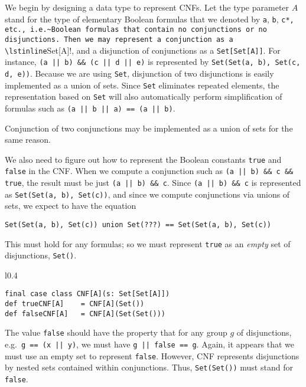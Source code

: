 We begin by designing a data type to represent CNFs. Let the type
parameter $A$ stand for the type of elementary Boolean formulas that
we denoted by \lstinline!a!, \lstinline!b!, \lstinline*!c*, etc.,
i.e.~Boolean formulas that contain no conjunctions or no disjunctions.
Then we may represent a conjunction as a \lstinline!Set[A]!, and
a disjunction of conjunctions as a \lstinline!Set[Set[A]]!. For instance,
\lstinline!(a || b) && (c || d || e)! is represented by \lstinline!Set(Set(a, b), Set(c, d, e))!.
Because we are using \lstinline!Set!, disjunction of two disjunctions
is easily implemented as a union of sets. Since \lstinline!Set! eliminates
repeated elements, the representation based on \lstinline!Set! will
also automatically perform simplification of formulas such as \lstinline!(a || b || a) == (a || b)!.

Conjunction of two conjunctions may be implemented as a union of sets
for the same reason.

We also need to figure out how to represent the Boolean constants
\lstinline!true! and \lstinline!false! in the CNF. When we compute
a conjunction such as \lstinline!(a || b) && c && true!, the result
must be just \lstinline!(a || b) && c!. Since \lstinline!(a || b) && c!
is represented as \lstinline!Set(Set(a, b), Set(c))!, and since we
compute conjunctions via unions of sets, we expect to have the equation
\begin{lstlisting}
Set(Set(a, b), Set(c)) union Set(???) == Set(Set(a, b), Set(c))
\end{lstlisting}
This must hold for any formulas; so we must represent \lstinline!true!
as an \emph{empty} set of disjunctions, \lstinline!Set()!.

\begin{wrapfigure}{l}{0.4\columnwidth}%
\vspace{-0.6\baselineskip}
\begin{lstlisting}
final case class CNF[A](s: Set[Set[A]])
def trueCNF[A]    = CNF[A](Set())
def falseCNF[A]   = CNF[A](Set(Set()))
\end{lstlisting}
\vspace{-0.8\baselineskip}
\end{wrapfigure}%

The value \lstinline!false! should have the property that for any
group $g$ of disjunctions, e.g.~\lstinline!g == (x || y)!, we must
have \lstinline!g || false == g!. Again, it appears that we must
use an empty set to represent \lstinline!false!. However, CNF represents
disjunctions by nested sets contained within conjunctions. Thus, \lstinline!Set(Set())!
must stand for \lstinline!false!.


